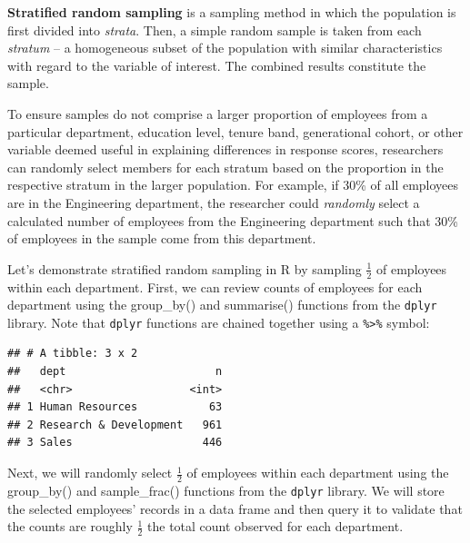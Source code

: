 \documentclass[]{book}
\newenvironment{Shaded}{\begin{snugshade}}{\end{snugshade}}
\newcommand{\CommentTok}[1]{\textcolor[rgb]{0.56,0.35,0.01}{\textit{#1}}}
\newcommand{\DataTypeTok}[1]{\textcolor[rgb]{0.13,0.29,0.53}{#1}}
\newcommand{\KeywordTok}[1]{\textcolor[rgb]{0.13,0.29,0.53}{\textbf{#1}}}
\newcommand{\NormalTok}[1]{#1}
\newcommand{\OperatorTok}[1]{\textcolor[rgb]{0.81,0.36,0.00}{\textbf{#1}}}
\begin{document}
\textbf{Stratified random sampling} is a sampling method in which the population is first divided into \emph{strata}. Then, a simple random sample is taken from each \emph{stratum} -- a homogeneous subset of the population with similar characteristics with regard to the variable of interest. The combined results constitute the sample.

To ensure samples do not comprise a larger proportion of employees from a particular department, education level, tenure band, generational cohort, or other variable deemed useful in explaining differences in response scores, researchers can randomly select members for each stratum based on the proportion in the respective stratum in the larger population. For example, if 30\% of all employees are in the Engineering department, the researcher could \emph{randomly} select a calculated number of employees from the Engineering department such that 30\% of employees in the sample come from this department.

Let's demonstrate stratified random sampling in R by sampling \(\frac{1}{2}\) of employees within each department. First, we can review counts of employees for each department using the group\_by() and summarise() functions from the \texttt{dplyr} library. Note that \texttt{dplyr} functions are chained together using a \texttt{\%\textgreater{}\%} symbol:

\begin{Shaded}
\end{Shaded}

\begin{verbatim}
## # A tibble: 3 x 2
##   dept                       n
##   <chr>                  <int>
## 1 Human Resources           63
## 2 Research & Development   961
## 3 Sales                    446
\end{verbatim}

Next, we will randomly select \(\frac{1}{2}\) of employees within each department using the group\_by() and sample\_frac() functions from the \texttt{dplyr} library. We will store the selected employees' records in a data frame and then query it to validate that the counts are roughly \(\frac{1}{2}\) the total count observed for each department.
\end{document}
